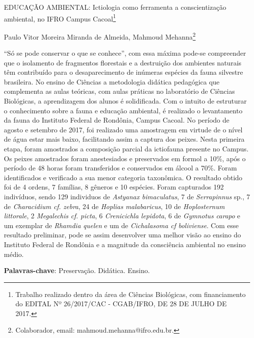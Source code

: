 \documentclass[article,12pt,onesidea,4paper,english,brazil]{abntex2}
\begin{document}
	
	
	\frenchspacing 
	
	\begin{center}
		\LARGE EDUCAÇÃO AMBIENTAL: Ictiologia como ferramenta a conscientização ambiental, no IFRO Campus Cacoal\footnote{Trabalho realizado dentro da área de Ciências Biológicas, com financiamento do EDITAL Nº 26/2017/CAC - CGAB/IFRO, DE 28 DE JULHO DE 2017.}
		
		\normalsize
		Paulo Vitor Moreira Miranda de Almeida,
		Mahmoud Mehanna\footnote{Colaborador, email: mahmoud.mehanna@ifro.edu.br.} 
	
	\end{center}
	
	\noindent “Só se pode conservar o que se conhece”, com essa máxima pode-se compreender que o isolamento de fragmentos florestais e a destruição dos ambientes naturais têm contribuído para o desaparecimento de inúmeras espécies da fauna silvestre brasileira. No ensino de Ciências a metodologia didática pedagógica que complementa as aulas teóricas, com aulas práticas no laboratório de Ciências Biológicas, a aprendizagem dos alunos é solidificada. Com o intuito de estruturar o conhecimento sobre a fauna e educação ambiental, é realizado o levantamento da fauna do Instituto Federal de Rondônia, Campus Cacoal. No período de agosto e setembro de 2017, foi realizado uma amostragem em virtude de o nível de água estar mais baixo, facilitando assim a captura dos peixes. Nesta primeira etapa, foram amostrados a composição parcial da ictiofauna presente no Campus. Os peixes amostrados foram anestesiados e preservados em formol a 10\%, após o período de 48 horas foram transferidos e conservados em álcool a 70\%. Foram identificados e verificado a sua menor categoria taxonômica. O resultado obtido foi de 4 ordens, 7 famílias, 8 gêneros e 10 espécies. Foram capturados 192 indivíduos, sendo 129 individuos de \textit{Astyanax bimaculatus}, 7 de \textit{Serrapinnus} sp., 7 de \textit{Characidium cf. zebra}, 24 de \textit{Hoplias malabaricus}, 10 de \textit{Hoplosternum littorale}, 2 \textit{Megalechis cf. picta}, 6 \textit{Crenicichla lepidota}, 6 de \textit{Gymnotus carapo} e um exemplar de \textit{Rhamdia quelen} e um de \textit{Cichalasoma cf boliviense}. Com esse resultado preliminar, pode se assim desenvolver uma melhor visão ao ensino do Instituto Federal de Rondônia e a magnitude da consciência ambiental no ensino médio.
	
	\vspace{\onelineskip}
	
	\noindent
	\textbf{Palavras-chave}: Preservação. Didática. Ensino.
	
\end{document}

